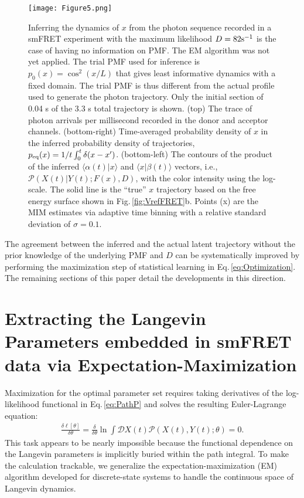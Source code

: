 \documentclass[journal=jpcbfk,manuscript=article,layout=twocolumn,articletitle=true]{achemso}
\begin{document}
\begin{figure}[t]
\centering
\texttt{[image: Figure5.png]}
\caption[Contours of inferred trajectory from smFRET]{\label{fig:InferTraj} Inferring the dynamics of $x$ from the photon sequence recorded in a smFRET experiment with the maximum likelihood $D=82 \rm s^{-1}$ is the case of having no information on PMF. The EM algorithm was not yet applied. The trial PMF used for inference is $p_0(x) = \cos^2(x/L)$ that gives least informative dynamics with a fixed domain.\cite{Haas:2013uja} The trial PMF is thus different from the actual profile used to generate the photon trajectory. Only the initial section of 0.04 s of the 3.3 s total trajectory is shown. (top) The trace of photon arrivals per millisecond recorded in the donor and acceptor channels. (bottom-right) Time-averaged probability density of $x$ in the inferred probability density of trajectories, $p_{\rm{eq}}(x) = 1/t \int_0^{t} \delta(x - x')$. (bottom-left)  The contours of the product of the inferred $\langle \alpha(t) | x \rangle$ and $\langle x | \beta(t) \rangle$ vectors, i.e., $\mathcal{P}(X(t)|Y(t); F(x), D)$, with the color intensity using the log-scale. The solid line is the ``true'' $x$ trajectory based on the free energy surface shown in Fig.\,\ref{fig:VrefFRET}b. Points (x) are the MIM estimates via adaptive time binning with a relative standard deviation of $\sigma=0.1$.\cite{Watkins:2004cia,Watkins:2006bu}}
\end{figure}

The agreement between the inferred and the actual latent trajectory without the prior knowledge of the underlying PMF and $D$ can be systematically improved by performing the maximization step of statistical learning in Eq.\,\ref{eq:Optimization}. The remaining sections of this paper detail the developments in this direction.  

\section{Extracting the Langevin Parameters embedded in smFRET data via Expectation-Maximization}

Maximization for the optimal parameter set requires taking derivatives of the log-likelihood functional in Eq.\,\ref{eq:PathP} and solves the resulting Euler-Lagrange equation:
\begin{align}
\label{eq:EL}
\frac{\delta \ell [\theta]}{\delta \theta} = \frac{\delta }{\delta \theta} \ln \int \mathcal{D}X(t) \mathcal{P}(X(t),Y(t);\theta) =0.
\end{align}
This task appears to be nearly impossible because the functional dependence on the Langevin parameters is implicitly buried within the path integral. To make the calculation trackable, we generalize the expectation-maximization (EM) algorithm\cite{Dempster_Larid_Rubin_1977-EM,Little:2002vf} developed for discrete-state systems\cite{Watkins:2005hba} to handle the continuous space of Langevin dynamics. 
\end{document}

